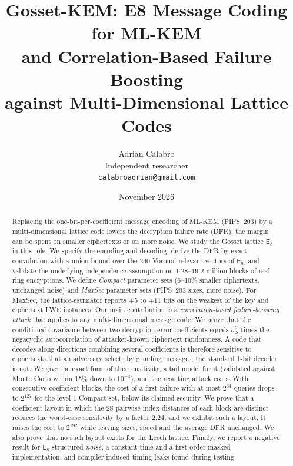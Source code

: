 \documentclass[11pt,a4paper]{article}
\title{Gosset-KEM: E8 Message Coding for ML-KEM\\ and Correlation-Based Failure Boosting\\ against Multi-Dimensional Lattice Codes}
\author{Adrian Calabro\\ \small Independent researcher \\ \small \texttt{calabroadrian@gmail.com}}
\date{November 2026}
\theoremstyle{definition}
\theoremstyle{remark}
\newcommand{\E}{\mathsf{E}_8}
\begin{document}
\sloppy
\maketitle

\begin{abstract}
Replacing the one-bit-per-coefficient message encoding of ML-KEM (FIPS~203) by a multi-dimensional lattice code lowers the decryption failure rate (DFR); the margin can be spent on smaller ciphertexts or on more noise. We study the Gosset lattice $\E$ in this role.
We specify the encoding and decoding, derive the DFR by exact convolution with a union bound over the 240 Voronoi-relevant vectors of $\E$, and validate the underlying independence assumption on $1.28$--$19.2$ million blocks of real ring encryptions.
We define \emph{Compact} parameter sets (6--10\% smaller ciphertexts, unchanged noise) and \emph{MaxSec} parameter sets (FIPS~203 sizes, more noise). For MaxSec, the lattice-estimator reports $+5$ to $+11$ bits on the weakest of the key and ciphertext LWE instances.
Our main contribution is a \emph{correlation-based failure-boosting attack} that applies to any multi-dimensional message code. We prove that the conditional covariance between two decryption-error coefficients equals $\sigma_S^2$ times the negacyclic autocorrelation of attacker-known ciphertext randomness. A code that decodes along directions combining several coefficients is therefore sensitive to ciphertexts that an adversary selects by grinding messages; the standard 1-bit decoder is not.
We give the exact form of this sensitivity, a tail model for it (validated against Monte Carlo within 15\% down to $10^{-4}$), and the resulting attack costs. With consecutive coefficient blocks, the cost of a first failure with at most $2^{64}$ queries drops to $2^{127}$ for the level-1 Compact set, below its claimed security. We prove that a coefficient layout in which the 28 pairwise index distances of each block are distinct reduces the worst-case sensitivity by a factor $2.24$, and we exhibit such a layout. It raises the cost to $2^{192}$ while leaving sizes, speed and the average DFR unchanged. We also prove that no such layout exists for the Leech lattice.
Finally, we report a negative result for $\E$-structured \emph{noise}, a constant-time and a first-order masked implementation, and compiler-induced timing leaks found during testing.
\end{abstract}
\end{document}
